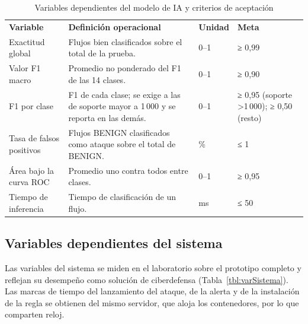\begin{table}[H]
\centering
\footnotesize
\renewcommand{\arraystretch}{1.2}
\caption{{\fontsize{11pt}{13}\selectfont Variables dependientes del modelo de IA y criterios de aceptación}}
\label{tbl:varModelo}
\begin{tabular}{@{}L{3.5cm}L{6.3cm}L{1.4cm}L{3.7cm}@{}}
\textbf{Variable} & \textbf{Definición operacional} & \textbf{Unidad} & \textbf{Meta} \\
Exactitud global & Flujos bien clasificados sobre el total de la prueba. & 0--1 & ≥ 0,99 \\
Valor F1 macro & Promedio no ponderado del F1 de las 14 clases. & 0--1 & ≥ 0,90 \\
F1 por clase & F1 de cada clase; se exige a las de soporte mayor a 1\,000 y se reporta en las demás. & 0--1 & ≥ 0,95 (soporte >1\,000); ≥ 0,50 (resto) \\
Tasa de falsos positivos & Flujos BENIGN clasificados como ataque sobre el total de BENIGN. & \% & ≤ 1 \\
Área bajo la curva ROC & Promedio uno contra todos entre clases. & 0--1 & ≥ 0,95 \\
Tiempo de inferencia & Tiempo de clasificación de un flujo. & ms & ≤ 50 \\
\end{tabular}
\end{table}

\subsection{Variables dependientes del sistema}

Las variables del sistema se miden en el laboratorio sobre el prototipo completo y reflejan su desempeño como solución de ciberdefensa (Tabla~\ref{tbl:varSistema}). Las marcas de tiempo del lanzamiento del ataque, de la alerta y de la instalación de la regla se obtienen del mismo servidor, que aloja los contenedores, por lo que comparten reloj.

